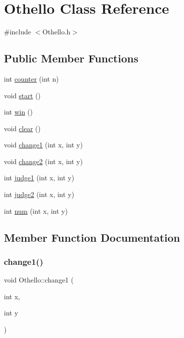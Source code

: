 \hypertarget{class_othello}{}\section{Othello Class Reference}
\label{class_othello}


{\ttfamily \#include $<$Othello.\+h$>$}

\subsection*{Public Member Functions}
\begin{DoxyCompactItemize}
\item 
int \hyperlink{class_othello_ac12d9682f956e7fedf9e120c71a35c59}{counter} (int n)
\item 
void \hyperlink{class_othello_afbd303f619ad4aa032aac05745f333cd}{start} ()
\item 
int \hyperlink{class_othello_aa988281f6c8107e7d078de68e9ae9d3d}{win} ()
\item 
void \hyperlink{class_othello_ae6fcfc01ad3e23ec98cdfd5f67208cb3}{clear} ()
\item 
void \hyperlink{class_othello_ae0203712ad7067ace03879191aa3c187}{change1} (int x, int y)
\item 
void \hyperlink{class_othello_ad98cd8ba030a4900155b7bbe1a36de98}{change2} (int x, int y)
\item 
int \hyperlink{class_othello_ae3d4f0fb9d242449b1cdf6adb0816016}{judge1} (int x, int y)
\item 
int \hyperlink{class_othello_abaa0a512973fc53bc75c9cae3ca4f478}{judge2} (int x, int y)
\item 
int \hyperlink{class_othello_a2cb68488152c90c5cfc916b62333d3b1}{num} (int x, int y)
\end{DoxyCompactItemize}


\subsection{Member Function Documentation}
\hypertarget{class_othello_ae0203712ad7067ace03879191aa3c187}{}\label{class_othello_ae0203712ad7067ace03879191aa3c187} 
\subsubsection{\texorpdfstring{change1()}{change1()}}
{\footnotesize\ttfamily void Othello\+::change1 (\begin{DoxyParamCaption}\item[{int}]{x,  }\item[{int}]{y }\end{DoxyParamCaption})}

